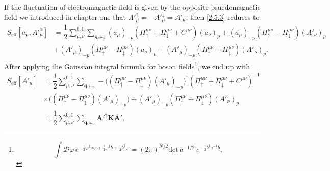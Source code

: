 \documentclass[bachelor,english,numbers]{ustcthesis}
\begin{document}
		If the fluctuation of electromagnetic field is given by the opposite psuedomagnetic field we introduced in chapter one that ${A'}_\mu^\uparrow=-{A'}_\mu^\downarrow=A'_\mu$, then \eqref{2.5.3} reduces to
		\begin{align}
			S_\text{eff}[a_\mu,{A'}^\alpha_\mu]&=\dfrac{1}{2}\sum_{\mu,\nu}^{0,1}\sum_{\bm{q},\omega_n}(a_\mu)_{-p}\left(\Pi^{\mu\nu}_\uparrow+\Pi^{\mu\nu}_\downarrow+C^{\mu\nu}\right)(a_\nu)_p+(a_\mu)_{-p}(\Pi^{\mu\nu}_\uparrow-\Pi^{\mu\nu}_\downarrow)(A'_\nu)_p\nonumber\\
			&+(A'_\mu)_{-p}(\Pi^{\mu\nu}_\uparrow-\Pi^{\mu\nu}_\downarrow)(a_\nu)_p+(A'_\mu)_{-p}(\Pi^{\mu\nu}_\uparrow+\Pi^{\mu\nu}_\downarrow)(A'_\nu)_p\label{2.5.5}.
		\end{align}
		After applying the Gaussian integral formula for boson fields\footnote{
		\begin{equation*}
			\int\mathcal{D}\varphi\,e^{-\frac{1}{2}\varphi^\dagger a \varphi+\frac{1}{2}\varphi^\dagger b+\frac{1}{2}b^\dagger \varphi}=(2\pi)^{N/2}\mathrm{det}\,a^{-1/2}\,e^{-\frac{1}{2}b^\dagger a^{-1} b},
		\end{equation*}}, we end up with
		\begin{align}
			S_{\text{eff}}[A'_\mu]&=\dfrac{1}{2}\sum_{\mu,\nu}^{0,1}\sum_{\bm{q},\omega_n}-\bigg((\Pi^{\mu\nu}_\uparrow-\Pi^{\mu\nu}_\downarrow)(A'_\mu)_{-p}\bigg)^\dagger\left(\Pi^{\mu\nu}_\uparrow+\Pi^{\mu\nu}_\downarrow+C^{\mu\nu}\right)^{-1}\nonumber\\
			&\times\bigg((\Pi^{\mu\nu}_\uparrow-\Pi^{\mu\nu}_\downarrow)(A'_\mu)_{-p}\bigg)+(A'_\mu)_{-p}(\Pi^{\mu\nu}_\uparrow+\Pi^{\mu\nu}_\downarrow)(A'_\nu)_p\nonumber\\
			&=\dfrac{1}{2}\sum_{\mu,\nu}^{0,1}\sum_{\bm{q},\omega_n}\bm{A'}^\dagger\bm{K}\bm{A'},\label{2.5.6}
		\end{align}
\end{document}
